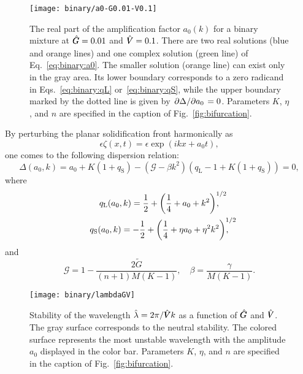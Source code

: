 \documentclass{article}
\newcommand{\liq}{\text{L}}
\newcommand{\sol}{\text{S}}
\newcommand{\qL}{q_\liq}
\newcommand{\qS}{q_\sol}
\newcommand{\hV}[1][\qty(\bar{V})]{\vphantom{#1}\mathrlap{\smash{\hat{V}}}V}
\newcommand{\hG}[1][\qty(\bar{G})]{\vphantom{#1}\mathrlap{\smash{\hat{G}}}G}
\begin{document}
\begin{figure}
    \centering
    \texttt{[image: binary/a0-G0.01-V0.1]}
    \caption{
        The real part of the amplification factor $a_0(k)$ for a binary mixture at $\hG=0.01$ and $\hV=0.1$.
        There are two real solutions (blue and orange lines)
        and one complex solution (green line) of Eq.~\eqref{eq:binary:a0}.
        The smaller solution (orange line) can exist only in the gray area.
        Its lower boundary corresponds to a zero radicand in Eqs.~\eqref{eq:binary:qL} or~\eqref{eq:binary:qS},
        while the upper boundary marked by the dotted line is given by $\pdv*{\Delta}{a_0}=0$.
        Parameters $K$, $\eta$, and $n$ are specified in the caption of Fig.~\ref{fig:bifurcation}.
    }\label{fig:binary:a0}
\end{figure}

By perturbing the planar solidification front harmonically as
\begin{equation}\label{eq:binary:perturbation}
    \epsilon\zeta(x,t) = \epsilon\exp(ikx + a_0t),
\end{equation}
one comes to the following dispersion relation:
\begin{equation}\label{eq:binary:a0}
    \Delta(a_0,k) = a_0 + K(1+\qS) - (\mathcal{G}-\beta k^2)(\qL-1 + K(1+\qS)) = 0,
\end{equation}
where
\begin{gather}
    \qL(a_0,k) = \frac12 + \qty(\frac14 + a_0 + k^2)^{\mathrlap{1/2}}, \label{eq:binary:qL}\\
    \qS(a_0,k) = -\frac12 + \qty(\frac14 + \eta a_0 + \eta^2k^2)^{\mathrlap{1/2}}, \label{eq:binary:qS}
\end{gather}
and
\begin{equation}\label{eq:Gbeta}
    \mathcal{G} = 1 - \frac{2\tilde{G}}{(n+1)M(K-1)}, \quad
    \beta = \frac{\gamma}{M(K-1)}.
\end{equation}

\begin{figure}
    \centering
    \vspace{-80pt}
    \texttt{[image: binary/lambdaGV]}
    \caption{
        Stability of the wavelength $\hat\lambda=2\pi/\hV k$ as a function of $\hG$ and $\hV$.
        The gray surface corresponds to the neutral stability.
        The colored surface represents the most unstable wavelength with the amplitude $a_0$ displayed in the color bar.
        Parameters $K$, $\eta$, and $n$ are specified in the caption of Fig.~\ref{fig:bifurcation}.
    }\label{fig:binary:lambdaGV}
\end{figure}
\end{document}
